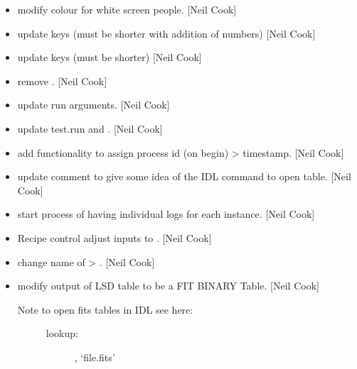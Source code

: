 \documentclass[a4paper,10pt,english]{report}
\begin{document}
\label{\detokenize{misc/changelog:id267}}\begin{itemize}
\item {} 
 \sphinxhyphen{} modify colour for white screen people. {[}Neil Cook{]}

\item {} 
 \sphinxhyphen{} update keys (must be shorter with addition of
numbers) {[}Neil Cook{]}

\item {} 
 \sphinxhyphen{} update keys (must be shorter) {[}Neil Cook{]}

\item {} 
 \sphinxhyphen{} remove . {[}Neil Cook{]}

\item {} 
 \sphinxhyphen{} update run arguments. {[}Neil Cook{]}

\item {} 
 \sphinxhyphen{} update test.run and . {[}Neil Cook{]}

\item {} 
 \sphinxhyphen{} add functionality to assign process id (on begin)
\textendash{}\textgreater{} timestamp. {[}Neil Cook{]}

\item {} 
 \sphinxhyphen{} update comment to give some idea of the IDL command
to open table. {[}Neil Cook{]}

\item {} 
 \sphinxhyphen{} start process of having individual logs for each
instance. {[}Neil Cook{]}

\item {} 
Recipe control \sphinxhyphen{} adjust inputs to . {[}Neil Cook{]}

\item {} 
 \sphinxhyphen{} change name of  \textendash{}\textgreater{}
. {[}Neil Cook{]}

\item {} 
 \sphinxhyphen{} modify output of LSD table to be a FIT BINARY Table.
{[}Neil Cook{]}
\begin{description}
\item[{Note to open fits tables in IDL see here:}] \leavevmode
{}
\begin{description}
\item[{lookup:}] \leavevmode
{}, ‘file.fits’


\end{description}
\end{description}
\end{itemize}
\end{document}
